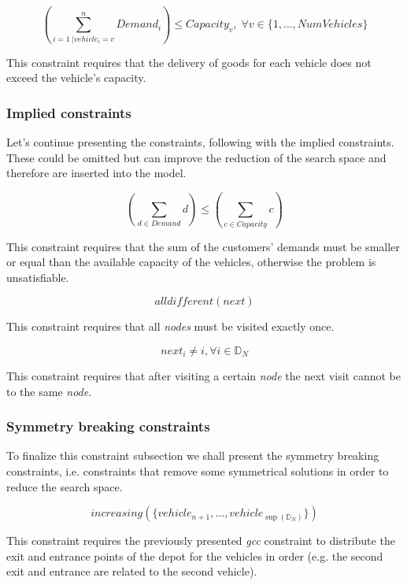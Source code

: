 \documentclass[../main.tex]{subfiles}
\begin{document}
\begin{center}
    \begin{equation}
        (\sum_{i = 1 \; | vehicle_i = v}^n{Demand_i}) \leq Capacity_v ,\; \forall v \in \{1,\dots,NumVehicles\}
    \end{equation}
\end{center}
This constraint requires that the delivery of goods for each vehicle does not exceed the vehicle's capacity.

\subsubsection{Implied constraints}
Let's continue presenting the constraints, following with the implied constraints. These could be omitted but can improve the reduction of the search space and therefore are inserted into the model.\\
\begin{center}
    \begin{equation}
        (\sum_{d \in Demand}{d}) \leq (\sum_{c \in Capacity}{c})
    \end{equation}
\end{center}
This constraint requires that the sum of the customers' demands must be smaller or equal than the available capacity of the vehicles, otherwise the problem is unsatisfiable.

\begin{center}
    \begin{equation}
        alldifferent(next)
    \end{equation}
\end{center}
This constraint requires that all \textit{nodes} must be visited exactly once.

\begin{center}
    \begin{equation}
        next_i \neq i, \forall i \in \mathbb{D}_N
    \end{equation}
\end{center}
This constraint requires that after visiting a certain \textit{node} the next visit cannot be to the same \textit{node}.

\subsubsection{Symmetry breaking constraints}
To finalize this constraint subsection we shall present the symmetry breaking constraints, i.e. constraints that remove some symmetrical solutions in order to reduce the search space.
\begin{center}
    \begin{equation}
        increasing(\{vehicle_{n+1},\dots,vehicle_{\sup{}(\mathbb{D}_N)}\})
    \end{equation}
\end{center}
This constraint requires the previously presented \textit{gcc} constraint to distribute the exit and entrance points of the depot for the vehicles in order (e.g. the second exit and entrance are related to the second vehicle).
\end{document}
